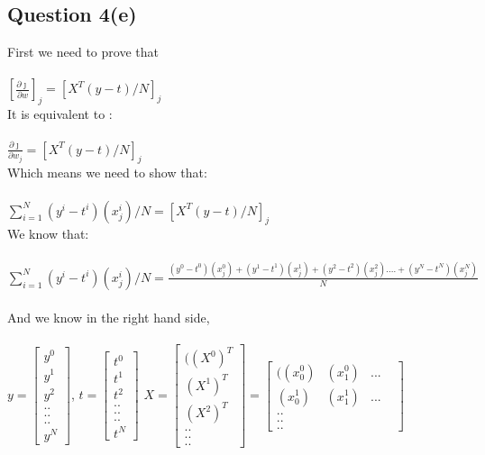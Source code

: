 \documentclass{article}
\begin{document}
        \subsection{Question 4(e)} 
        First we need to prove that\\
        \\ $[\frac{\partial\jmath}{\partial w}]_{j} = [X^T(y-t)/N]_{j}$\\
        It is equivalent to :\\\\
        	$\frac{\partial\jmath}{\partial w_{j}} = [X^T(y-t)/N]_{j}$\\
        Which means we need to show that:\\\\
        	$ \sum_{i=1}^{N}(y^i-t^i)(x^i_j)/N = [X^T(y-t)/N]_{j}$\\
        We know that:\\\
        $ \sum_{i=1}^{N}(y^i-t^i)(x^i_j)/N = \frac{(y^0-t^0)(x_j^0)+(y^1-t^1)(x_j^1)+(y^2-t^2)(x_j^2)....+(y^N-t^N)(x_j^N)}{N}$\\\\
        And we know in the right hand side,\\\\
        $y =  \begin{bmatrix}y^0 \\ y^1\\y^2\\..\\..\\..\\y^N \end{bmatrix}$,
        $t =  \begin{bmatrix}t^0 \\ t^1\\t^2\\..\\..\\..\\t^N \end{bmatrix}$
        $X = \begin{bmatrix}((X^0)^T \\ (X^1)^T\\(X^2)^T\\..\\..\\.. \end{bmatrix} = 
        \begin{bmatrix}((x_{0}^0) & (x_{1}^0) &...& \\ (x_{0}^1) & (x_{1}^1)&...\\..\\..\\.. \end{bmatrix}$\\\\
\end{document}
